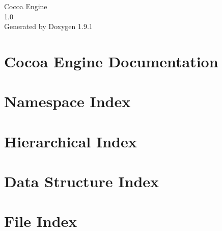 \let\mypdfximage\pdfximage\def\pdfximage{\immediate\mypdfximage}\documentclass[twoside]{book}
\newcommand{\+}{\discretionary{\mbox{\scriptsize$\hookleftarrow$}}{}{}}
\newcommand{\clearemptydoublepage}{%
  \newpage{\pagestyle{empty}\cleardoublepage}%
}
\begin{document}
\raggedbottom

\hypersetup{pageanchor=false,
             bookmarksnumbered=true,
             pdfencoding=unicode
            }
\begin{titlepage}
\vspace*{7cm}
\begin{center}%
{\Large Cocoa Engine \\[1ex]\large 1.\+0 }\\
\vspace*{1cm}
{\large Generated by Doxygen 1.9.1}\\
\end{center}
\end{titlepage}
\clearemptydoublepage
{}
\tableofcontents
\clearemptydoublepage
{}
\hypersetup{pageanchor=true}

\chapter{Cocoa Engine Documentation}
\label{index}\hypertarget{index}{}
\chapter{Namespace Index}

\chapter{Hierarchical Index}

\chapter{Data Structure Index}

\chapter{File Index}

\end{document}
